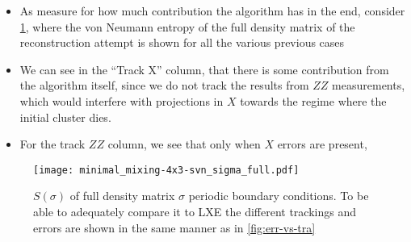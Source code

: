 \begin{itemize}
  \item As measure for how much contribution the algorithm has in the end,
    consider \cref{fig:min_mix-svn_sigma_full-4x3}, where the von Neumann
    entropy of the full density matrix of the reconstruction attempt is shown
    for all the various previous cases
  \item We can see in the \enquote{Track X} column, that there is some
    contribution from the algorithm itself, since we do not track the results
    from $ZZ$ measurements, which would interfere with projections in $X$
    towards the regime where the initial cluster dies. 
  \item For the track $ZZ$ column, we see that only when $X$ errors are
    present, 
\end{itemize}

\begin{figure}[p]
  \centering
  \texttt{[image: minimal\_mixing-4x3-svn\_sigma\_full.pdf]}
  \caption{$S(\sigma)$ of full density matrix $\sigma$ 
  periodic boundary conditions. To be able to adequately compare it to LXE the
different trackings and errors are shown in the same manner as in
\cref{fig:err-vs-tra}}
  \label{fig:min_mix-svn_sigma_full-4x3}
\end{figure}

